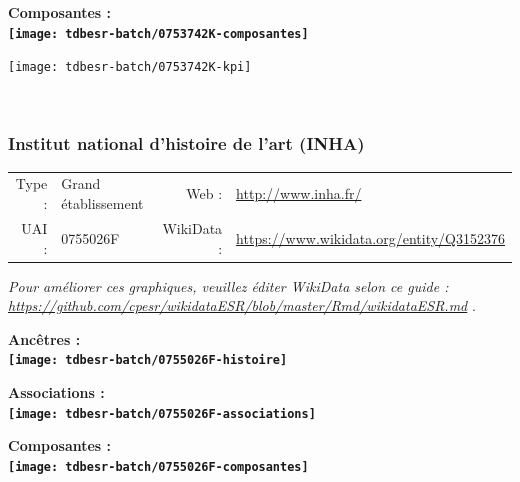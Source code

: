 \documentclass[12pt,french,]{article}
\begin{document}
\begin{center} \bf Composantes : \\  
\texttt{[image: tdbesr-batch/0753742K-composantes]} \end{center}

\begin{center}\texttt{[image: tdbesr-batch/0753742K-kpi]} \end{center}\checkoddpage

\ifoddpage \fi ~\newpage  

\hypertarget{institut-national-dhistoire-de-lart-inha}{%
\subsubsection{Institut national d'histoire de l'art
(INHA)}\label{institut-national-dhistoire-de-lart-inha}}

\begin{tabular*}{\textwidth}{rp{5cm}rl}  
\hline  
Type : & Grand établissement & Web : &\href{http://www.inha.fr/}{http://www.inha.fr/} \\  
UAI : & 0755026F & WikiData : & \href{https://www.wikidata.org/entity/Q3152376}{https://www.wikidata.org/entity/Q3152376} \\  
\hline  
\end{tabular*}

\textit{\scriptsize Pour améliorer ces graphiques, veuillez éditer WikiData selon ce guide :  \href{https://github.com/cpesr/wikidataESR/blob/master/Rmd/wikidataESR.md}{https://github.com/cpesr/wikidataESR/blob/master/Rmd/wikidataESR.md}}
.

\vspace{1cm}  
\begin{minipage}[b]{0.50\textwidth}\begin{center} \bf Ancêtres : \\  
\texttt{[image: tdbesr-batch/0755026F-histoire]} \end{center}\end{minipage}\begin{minipage}[b]{0.50\textwidth}\begin{center} \bf Associations : \\  
\texttt{[image: tdbesr-batch/0755026F-associations]} \end{center}\end{minipage}

\hrulefill

\begin{center} \bf Composantes : \\  
\texttt{[image: tdbesr-batch/0755026F-composantes]} \end{center}
\end{document}
